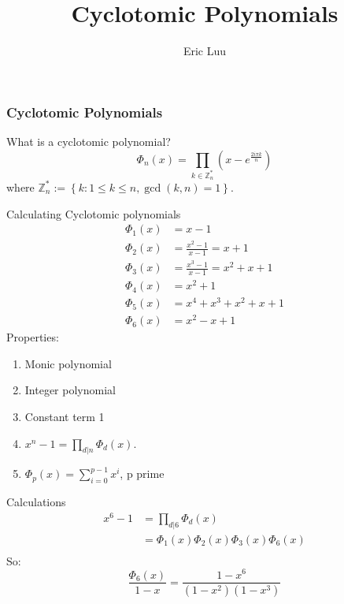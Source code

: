 \documentclass[]{beamer}
\title{Cyclotomic Polynomials}
\author{Eric Luu}
\begin{document}
\begin{frame}
\frametitle{Cyclotomic Polynomials}
\begin{block}{What is a cyclotomic polynomial?}
		\begin{equation}
		\Phi_n(x) = \prod_{k \in \mathbb{Z}_n^*}\left(x - e^{\frac{2 i \pi k}{n}}\right)
	\end{equation}
	where $\mathbb{Z}_n^* := \left\lbrace k : 1 \leq k \leq n, \gcd(k, n) = 1 \right\rbrace$. 
\end{block}

\end{frame}

\begin{frame}{Calculating Cyclotomic polynomials}
	\begin{align*}
		\Phi_1(x) &= x - 1\\
		\Phi_2(x) &= \frac{x^2 - 1}{x - 1} = x + 1\\
		\Phi_3(x) &= \frac{x^3 - 1}{x-1} = x^2 + x + 1\\
		\Phi_4(x) &= x^2 + 1\\
		\Phi_5(x) &= x^4 + x^3 + x^2 + x + 1\\
		\Phi_6(x) &= x^2 - x + 1
	\end{align*}
	Properties:
	\begin{enumerate}
		\item Monic polynomial
		\item Integer polynomial
		\item Constant term 1
		\item $x^n - 1 = \prod_{d|n} \Phi_d(x)$.
		\item $\Phi_p(x) = \sum_{i = 0}^{p-1} x^i$, p prime
	\end{enumerate}
\end{frame}
\begin{frame}{Calculations}
	\begin{align*}
		x^6 - 1 &= \prod_{d | 6} \Phi_d(x)\\
		&= \Phi_1(x) \Phi_2(x) \Phi_3(x) \Phi_6(x)\\
	\end{align*}
	So:
	\begin{equation}
		\frac{\Phi_6(x)}{1-x} = \frac{1 - x^6}{(1 - x^2)(1 - x^3)}
	\end{equation}
\end{frame}
\end{document}
